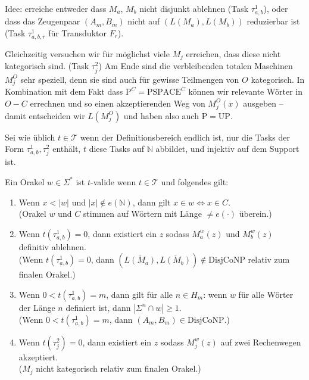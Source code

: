 \documentclass[nofonts]{uebung}
\def\P{\ensuremath{\mathrm{P}}}
\def\UP{\ensuremath{\mathrm{UP}}}
\def\DisjCoNP{\ensuremath{\mathrm{DisjCoNP}}}
\begin{document}
Idee: erreiche entweder dass $M_a$, $M_b$ nicht disjunkt ablehnen (Task $\tau^1_{a,b}$), oder dass das Zeugenpaar $(A_m,B_m)$ nicht auf $(L(M_a),L(M_b))$ reduzierbar ist (Task $\tau^1_{a,b,r}$ für Transduktor $F_r$).

Gleichzeitig versuchen wir für möglichst viele $M_j$ erreichen, dass diese nicht kategorisch sind. (Task $\tau^2_j$)
Am Ende sind die verbleibenden totalen Maschinen $M^O_j$ sehr speziell, denn sie sind auch für gewisse Teilmengen von $O$ kategorisch.
In Kombination mit dem Fakt dass $\P^C=\mathrm{PSPACE}^C$ können wir relevante Wörter in $O-C$ errechnen und so einen akzeptierenden Weg von $M^O_j(x)$ ausgeben -- damit entscheiden wir $L(M^O_j)$ und haben also auch $\P=\UP$.
\medskip

Sei wie üblich $t\in \mathcal T$ wenn der Definitionsbereich endlich ist, nur die Tasks der Form $\tau^1_{a,b}, \tau^2_j$ enthält, $t$ diese Tasks auf $\mathbb N$ abbildet, und injektiv auf dem Support ist.

Ein Orakel $w\in\Sigma^*$ ist $t$-valide wenn $t\in\mathcal T$ und folgendes gilt:
\begin{enumerate}[label={V\arabic*}]
    \item Wenn $x<|w|$ und $|x|\not\in e(\mathbb N)$, dann gilt $x\in w\iff x\in C$.\\
        (Orakel $w$ und $C$ stimmen auf Wörtern mit Länge $\neq e(\cdot)$ überein.)
    \item Wenn $t(\tau^1_{a,b})=0$, dann existiert ein $z$ sodass $M_a^w(z)$ und $M_b^w(z)$ definitiv ablehnen.\\
        (Wenn $t(\tau^1_{a,b})=0$, dann $(\overline{L(M_a)}, \overline{ L(M_b)})\not\in \DisjCoNP$ relativ zum finalen Orakel.)
    \item Wenn $0<t(\tau^1_{a,b})=m$, dann gilt für alle $n\in H_m$: wenn $w$ für alle Wörter der Länge $n$ definiert ist, dann $|\Sigma^n\cap w|\geq 1$.\\
        (Wenn $0<t(\tau^1_{a,b})=m$, dann $(A_m,B_m)\in\DisjCoNP$.)
    \item Wenn $t(\tau^2_j)=0$, dann existiert ein $z$ sodass $M_j^w(z)$ auf zwei Rechenwegen akzeptiert.\\
        ($M_j$ nicht kategorisch relativ zum finalen Orakel.)
\end{enumerate}
\end{document}
